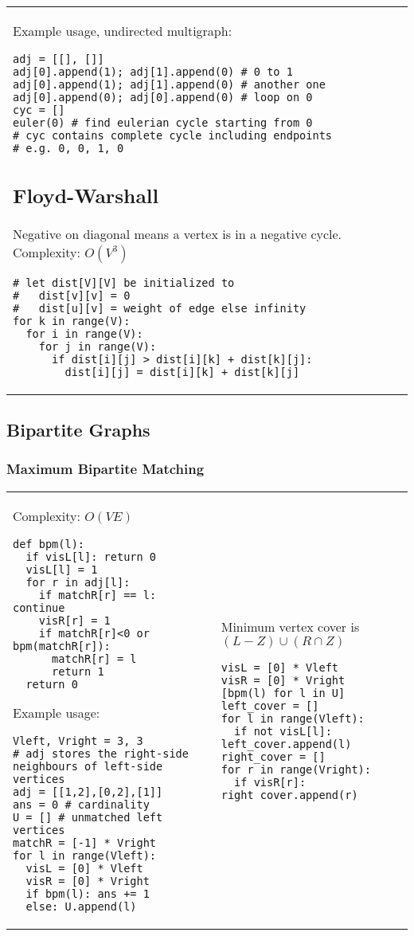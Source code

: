 \documentclass[letterpaper]{article}
\begin{document}
\begin{tabular}{@{}p{9cm}p{9cm}@{}}
    Example usage, undirected multigraph:
    \begin{lstlisting}
adj = [[], []]
adj[0].append(1); adj[1].append(0) # 0 to 1
adj[0].append(1); adj[1].append(0) # another one
adj[0].append(0); adj[0].append(0) # loop on 0
cyc = []
euler(0) # find eulerian cycle starting from 0
# cyc contains complete cycle including endpoints
# e.g. 0, 0, 1, 0
\end{lstlisting}
    \subsection{Floyd-Warshall}

    Negative on diagonal means a vertex is in a negative cycle. Complexity: $O\left(V^3\right)$

    \begin{lstlisting}
# let dist[V][V] be initialized to
#   dist[v][v] = 0
#   dist[u][v] = weight of edge else infinity
for k in range(V):
  for i in range(V):
    for j in range(V):
      if dist[i][j] > dist[i][k] + dist[k][j]:
        dist[i][j] = dist[i][k] + dist[k][j]
\end{lstlisting}
\end{tabular}

\clearpage
\subsection{Bipartite Graphs}
\subsubsection{Maximum Bipartite Matching}
\begin{tabular}{@{}p{9cm}p{9cm}@{}}
    Complexity: $O\left(VE\right)$
    \begin{lstlisting}
def bpm(l):
  if visL[l]: return 0
  visL[l] = 1
  for r in adj[l]:
    if matchR[r] == l: continue
    visR[r] = 1
    if matchR[r]<0 or bpm(matchR[r]):
      matchR[r] = l
      return 1
  return 0
\end{lstlisting}

    Example usage:
    \begin{lstlisting}
Vleft, Vright = 3, 3
# adj stores the right-side neighbours of left-side vertices
adj = [[1,2],[0,2],[1]]
ans = 0 # cardinality
U = [] # unmatched left vertices
matchR = [-1] * Vright
for l in range(Vleft):
  visL = [0] * Vleft
  visR = [0] * Vright
  if bpm(l): ans += 1
  else: U.append(l)
\end{lstlisting}
     &
    Minimum vertex cover is $\left(L-Z\right) \cup \left(R \cap Z\right)$
    \begin{lstlisting}
visL = [0] * Vleft
visR = [0] * Vright
[bpm(l) for l in U]
left_cover = []
for l in range(Vleft):
  if not visL[l]: left_cover.append(l)
right_cover = []
for r in range(Vright):
  if visR[r]: right_cover.append(r)
\end{lstlisting}
\end{tabular}
\end{document}
